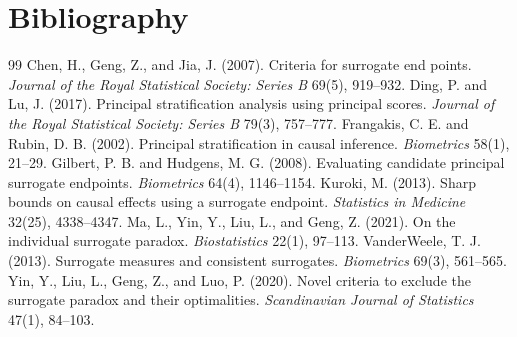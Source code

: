 \documentclass[11pt]{article}
\theoremstyle{definition}
\theoremstyle{plain}
\theoremstyle{remark}
\begin{document}
\section*{Bibliography}
\begin{thebibliography}{99}
 Chen, H., Geng, Z., and Jia, J. (2007). Criteria for surrogate end points. \emph{Journal of the Royal Statistical Society: Series B} 69(5), 919--932.
 Ding, P. and Lu, J. (2017). Principal stratification analysis using principal scores. \emph{Journal of the Royal Statistical Society: Series B} 79(3), 757--777.
 Frangakis, C. E. and Rubin, D. B. (2002). Principal stratification in causal inference. \emph{Biometrics} 58(1), 21--29.
 Gilbert, P. B. and Hudgens, M. G. (2008). Evaluating candidate principal surrogate endpoints. \emph{Biometrics} 64(4), 1146--1154.
 Kuroki, M. (2013). Sharp bounds on causal effects using a surrogate endpoint. \emph{Statistics in Medicine} 32(25), 4338--4347.
 Ma, L., Yin, Y., Liu, L., and Geng, Z. (2021). On the individual surrogate paradox. \emph{Biostatistics} 22(1), 97--113.
 VanderWeele, T. J. (2013). Surrogate measures and consistent surrogates. \emph{Biometrics} 69(3), 561--565.
 Yin, Y., Liu, L., Geng, Z., and Luo, P. (2020). Novel criteria to exclude the surrogate paradox and their optimalities. \emph{Scandinavian Journal of Statistics} 47(1), 84--103.
\end{thebibliography}
\end{document}

